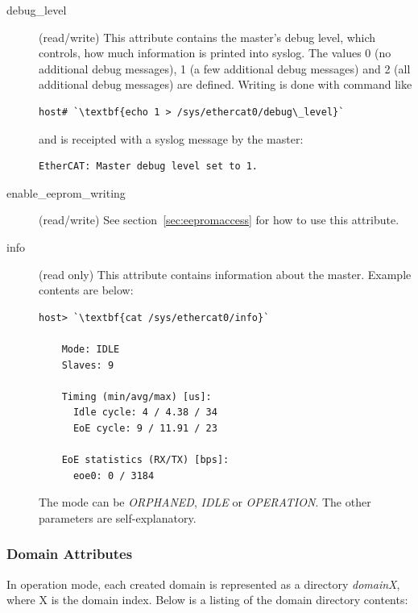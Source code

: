 \documentclass[a4paper,12pt,BCOR6mm,bibtotoc,idxtotoc]{scrbook}
\begin{document}
\begin{description}
\item[debug\_level] (read/write) This attribute contains the master's
  debug level, which controls, how much information is printed into
  syslog. The values 0 (no additional debug messages), 1 (a few
  additional debug messages) and 2 (all additional debug messages) are
  defined. Writing is done with command like

  \begin{lstlisting}[gobble=4]
    host# `\textbf{echo 1 > /sys/ethercat0/debug\_level}`
  \end{lstlisting}

  and is receipted with a syslog message by the master:

  \begin{lstlisting}[gobble=4]
    EtherCAT: Master debug level set to 1.
  \end{lstlisting}

\item[enable\_eeprom\_writing] (read/write) See
  section~\ref{sec:eepromaccess} for how to use this attribute.

\item[info] (read only) This attribute contains information about the
  master. Example contents are below:

  \begin{lstlisting}[gobble=4]
    host> `\textbf{cat /sys/ethercat0/info}`

    Mode: IDLE
    Slaves: 9

    Timing (min/avg/max) [us]:
      Idle cycle: 4 / 4.38 / 34
      EoE cycle: 9 / 11.91 / 23

    EoE statistics (RX/TX) [bps]:
      eoe0: 0 / 3184
  \end{lstlisting}

  The mode can be \textit{ORPHANED}, \textit{IDLE} or
  \textit{OPERATION}. The other parameters are self-explanatory.

\end{description}

\subsubsection{Domain Attributes}
\label{sec:sysfs-domain}

In operation mode, each created domain is represented as a directory
\textit{domainX}, where X is the domain index. Below is a listing of
the domain directory contents:
\end{document}
